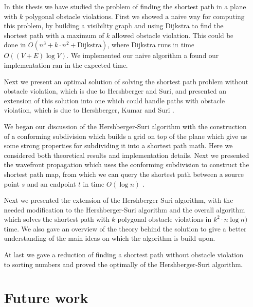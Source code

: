 In this thesis we have studied the problem of finding the shortest path in a plane with $k$ 
polygonal obstacle violations. First we showed a naive way for computing this problem, by 
building a visibility graph and using Dijkstra to find the shortest path with a maximum of 
$k$ allowed obstacle violation. This could be done in $O(n^3 + k \cdot n^2 + \text{Dijkstra})$, 
where Dijkstra runs in time $O((V + E) \log V)$. We implemented our naive algorithm a found 
our implementation ran in the expected time. 

Next we present an optimal solution of solving the shortest path problem without obstacle violation, 
which is due to Hershberger and Suri\cite{HershbergerS99}, and presented an extension of this solution 
into one which could handle paths with obstacle violation, which is due to Hershberger, Kumar and Suri
\cite{HershbergerKS17}. 

We began our discussion of the Hershberger-Suri algorithm with the construction of a conforming 
subdivision which builds a grid on top of the plane which give us some strong properties for subdividing 
it into a shortest path math. Here we considered both theoretical results and implementation details. 
Next we presented the wavefront propagation which uses the conforming subdivision to construct 
the shortest path map, from which we can query the shortest path between a source point $s$ 
and an endpoint $t$ in time $O(\log n)$ \cite{DBLP:journals/siamcomp/Kirkpatrick83}. 

Next we presented the extension of the Hershberger-Suri algorithm, with the needed modification
to the Hershberger-Suri algorithm and the overall algorithm which solves the shortest path with
$k$ polygonal obstacle violations in $k^2 \cdot n \log n)$ time. We also gave an overview of the
theory behind the solution to give a better understanding of the main ideas on which the algorithm
is build upon.

At last we gave a reduction of finding a shortest path without obstacle violation to sorting numbers
and proved the optimally of the Hershberger-Suri algorithm.

\section{Future work}